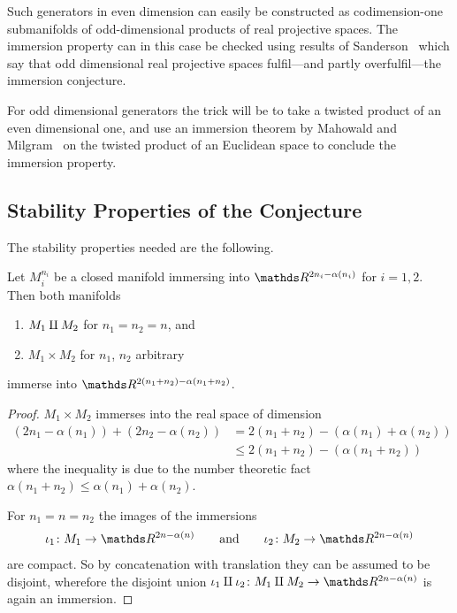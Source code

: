 Such generators in even dimension can easily be constructed as
codimension-one submanifolds of odd-dimensional products of
real projective spaces. The immersion property can in this case be
checked using results of Sanderson~\cite{sanderson} which say that
odd dimensional real projective spaces fulfil---and partly
overfulfil---the immersion conjecture.

For odd dimensional generators the trick will be to take a twisted
product of an even dimensional one, and use an immersion theorem by
Mahowald and Milgram~\cite{milgram} on the twisted product of an
Euclidean space to conclude the immersion property.

\subsection{Stability Properties of the Conjecture}
The stability properties needed are the following.
\begin{Lem}\label{lem:brownstableunderringops}
  Let $M_i^{n_i}$ be a closed manifold immersing into
  $\R^{2n_i-\alpha(n_i)}$ for $i=1,2$.
  Then both manifolds
  \begin{enumerate}
  \item $M_1\amalg M_2$ for $n_1=n_2=n$, and
  \item $M_1\times M_2$ for $n_1$, $n_2$ arbitrary
  \end{enumerate}
  immerse into $\R^{2(n_1+n_2)-\alpha(n_1+n_2)}$.
  \begin{proof}
    $M_1\times M_2$ immerses into the real space of dimension
    \begin{align*}
      \left( 2n_1-\alpha(n_1) \right)
      + \left( 2n_2-\alpha(n_2) \right)
      &= 2(n_1+n_2) - \left(\alpha(n_1)+\alpha(n_2)\right)\\
      &\leq 2(n_1+n_2) - \left(\alpha(n_1 + n_2)\right)
    \end{align*}
    where the inequality is due to the number theoretic fact
    $\alpha(n_1+n_2) \leq \alpha(n_1)+\alpha(n_2)$.

    For $n_1=n=n_2$ the images of the immersions
    \begin{gather*}
      \iota_1\colon M_1\to\R^{2n-\alpha(n)}
      \qquad \text{and} \qquad
      \iota_2\colon M_2\to\R^{2n-\alpha(n)}
    \end{gather*}
    are compact. So by
    concatenation with translation they can be assumed to be disjoint,
    wherefore the disjoint union
    $\iota_1\disjointsum\iota_2\colon M_1\disjointsum M_2\to\R^{2n-\alpha(n)}$
    is again an immersion.
  \end{proof}
\end{Lem}

